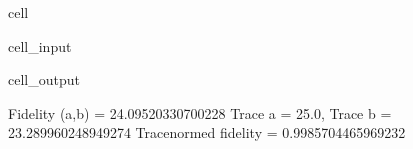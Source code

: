 \documentclass[letterpaper,table,10pt,english]{jupyterBook}
\begin{document}
\begin{sphinxuseclass}{cell}\begin{sphinxVerbatimInput}

\begin{sphinxuseclass}{cell_input}
\begin{sphinxVerbatim}[commandchars=\\\{\}]
\end{sphinxVerbatim}

\end{sphinxuseclass}\end{sphinxVerbatimInput}
\begin{sphinxVerbatimOutput}

\begin{sphinxuseclass}{cell_output}
\begin{sphinxVerbatim}[commandchars=\\\{\}]
Fidelity (a,b) = 24.09520330700228
Trace a = 25.0, Trace b = 23.289960248949274
Trace\PYGZhy{}normed fidelity = 0.9985704465969232
\end{sphinxVerbatim}

\end{sphinxuseclass}\end{sphinxVerbatimOutput}

\end{sphinxuseclass}
\end{document}
